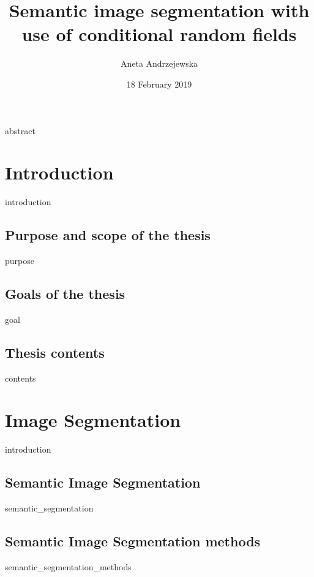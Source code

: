 \documentclass[12pt]{report}
\title{Semantic image segmentation with use of conditional random fields}
\author{Aneta Andrzejewska}
\date{18 February 2019}
\newcommand\blankpage{%
    \null
    \thispagestyle{empty}%
    \addtocounter{page}{-1}%
    \newpage}
\begin{document}
\thispagestyle{empty}%
\addtocounter{page}{-1}%
\begin{titlepage}
\afterpage{\blankpage}

\end{titlepage}


\thispagestyle{empty}
\afterpage{\blankpage}
{abstract}
\thispagestyle{empty}
\afterpage{\blankpage}
\addtocounter{page}{-1}%


\tableofcontents
\newpage

\chapter{Introduction}
    {introduction}
    
    \section{Purpose and scope of the thesis}
    {purpose}
    
    \section{Goals of the thesis}
    {goal}
    
    \section{Thesis contents}
    {contents}

\chapter{Image Segmentation}
    \label{chapter:segmentation}
    {introduction}
    
    \section{Semantic Image Segmentation}
    {semantic_segmentation}
    
    \section{Semantic Image Segmentation methods}
    {semantic_segmentation_methods}
\end{document}
